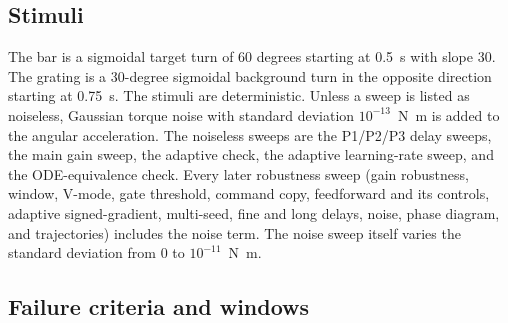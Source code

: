 \documentclass[pdflatex,sn-nature]{sn-jnl}
\begin{document}
\subsection{Stimuli}

The bar is a sigmoidal target turn of 60 degrees starting at 0.5~s with slope 30. The grating is a 30-degree sigmoidal background turn in the opposite direction starting at 0.75~s. The stimuli are deterministic. Unless a sweep is listed as noiseless, Gaussian torque noise with standard deviation $10^{-13}$~N~m is added to the angular acceleration. The noiseless sweeps are the P1/P2/P3 delay sweeps, the main gain sweep, the adaptive check, the adaptive learning-rate sweep, and the ODE-equivalence check. Every later robustness sweep (gain robustness, window, V-mode, gate threshold, command copy, feedforward and its controls, adaptive signed-gradient, multi-seed, fine and long delays, noise, phase diagram, and trajectories) includes the noise term. The noise sweep itself varies the standard deviation from 0 to $10^{-11}$~N~m.

\subsection{Failure criteria and windows}
\end{document}
